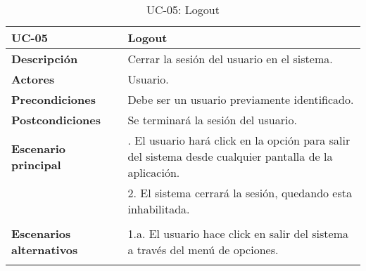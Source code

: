 \begin{table}[H]
  \begin{center}
    \begin{tabularx}{16.4cm}{|l|X|}
      \hline
      \textbf{UC-05} & \textbf{Logout}\\
      \hline
      \textbf{Descripción} & Cerrar la sesión del usuario en el sistema.\\
      \hline
      \textbf{Actores} & Usuario.\\
      \hline
      \textbf{Precondiciones} & Debe ser un usuario previamente identificado.\\
      \hline
      \textbf{Postcondiciones} & Se terminará la sesión del usuario.\\
      \hline
      \textbf{Escenario principal} & \smallskip 1. El usuario hará click en la opción para salir del sistema desde cualquier pantalla de la aplicación.\\
      & 2. El sistema cerrará la sesión, quedando esta inhabilitada.\\
      & \\
      \hline
      \textbf{Escenarios alternativos} & \smallskip 1.a. El usuario hace click en salir del sistema a través del menú de opciones.\\
      & \\
      \hline
    \end{tabularx}
    \caption{UC-05: Logout}
  \end{center}
\end{table}



